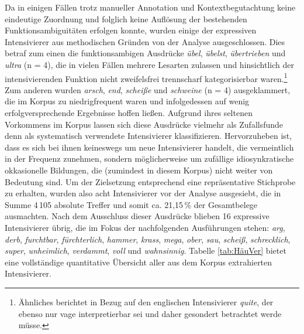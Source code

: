 Da in einigen Fällen trotz manueller Annotation und Kontextbegutachtung keine eindeutige Zuordnung und folglich keine Auflösung der bestehenden Funktionsambiguitäten erfolgen konnte, wurden einige der expressiven Intensivierer aus methodischen Gründen von der Analyse ausgeschlossen. Dies betraf zum einen die funktionsambigen Ausdrücke \textit{übel}, \textit{übelst}, \textit{übertrieben} und \textit{ultra} (n = 4), die in vielen Fällen mehrere Lesarten zulassen und hinsichtlich der intensivierenden Funktion nicht zweifelsfrei trennscharf kategorisierbar waren.\footnote{Ähnliches berichtet \citet[557]{Athanasiadou.2007} in Bezug auf den englischen Intensivierer \textit{quite}, der ebenso nur vage interpretierbar sei und daher gesondert betrachtet werde müsse.} Zum anderen wurden \textit{arsch}, \textit{end}, \textit{scheiße} und \textit{schweine} (n = 4) ausgeklammert, die im Korpus zu niedrigfrequent waren und infolgedessen auf wenig erfolgversprechende Ergebnisse hoffen ließen. Aufgrund ihres seltenen Vorkommens im Korpus lassen sich diese Ausdrücke vielmehr als Zufallsfunde denn als systematisch verwendete Intensivierer klassifizieren. Hervorzuheben ist, dass es sich bei ihnen keineswegs um neue Intensivierer handelt, die vermeintlich in der Frequenz zunehmen, sondern möglicherweise um zufällige idiosynkratische okkasionelle Bildungen, die (zumindest in diesem Korpus) nicht weiter von Bedeutung sind. Um der Zielsetzung entsprechend eine repräsentative Stichprobe zu erhalten, wurden also acht Intensivierer vor der Analyse ausgesiebt, die in Summe 4\,105 absolute Treffer und somit ca. 21,15\,\% der Gesamtbelege ausmachten. Nach dem Ausschluss dieser Ausdrücke blieben 16 expressive Intensivierer übrig, die im Fokus der nachfolgenden Ausführungen stehen: \textit{arg}, \textit{derb}, \textit{furchtbar}, \textit{fürchterlich}, \textit{hammer}, \textit{krass}, \textit{mega}, \textit{ober}, \textit{sau}, \textit{scheiß}, \textit{schrecklich}, \textit{super}, \textit{unheimlich}, \textit{verdammt}, \textit{voll} und \textit{wahnsinnig}. Tabelle \ref{tab:HäuVer} bietet eine vollständige quantitative Übersicht aller aus dem Korpus extrahierten Intensivierer.

